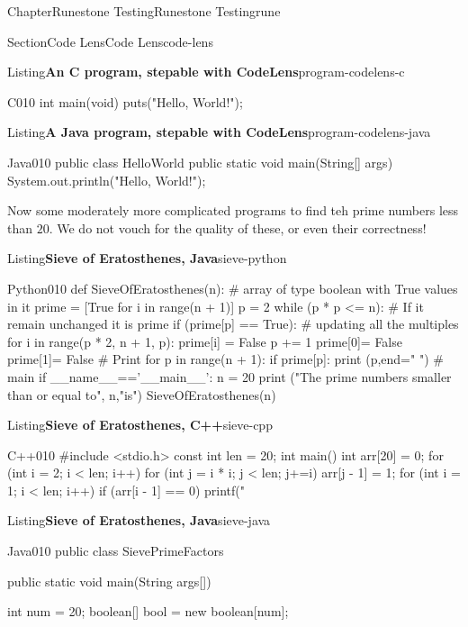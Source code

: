 \documentclass[oneside,10pt,]{book}
\numberwithin{equation}{section}
\begin{document}
\begin{chapterptx}{Chapter}{Runestone Testing}{}{Runestone Testing}{}{}{rune}
\begin{sectionptx}{Section}{Code Lens}{}{Code Lens}{}{}{code-lens}
\begin{listingptx}{Listing}{\textbf{An C program, stepable with CodeLens}}{program-codelens-c}{}
\begin{program}{C}{0}{1}{0}
int main(void)
{
    puts("Hello, World!");
}
\end{program}
\end{listingptx}%
\begin{listingptx}{Listing}{\textbf{A Java program, stepable with CodeLens}}{program-codelens-java}{}%
\begin{program}{Java}{0}{1}{0}
public class HelloWorld {
    public static void main(String[] args) {
        System.out.println("Hello, World!");
    }
}
\end{program}
\end{listingptx}%
Now some moderately more complicated programs to find teh prime numbers less than \(20\).  We do not vouch for the quality of these, or even their correctness!%
\begin{listingptx}{Listing}{\textbf{Sieve of Eratosthenes\protect\footnotemark{}, Java}}{sieve-python}{}%
\begin{program}{Python}{0}{1}{0}
def SieveOfEratosthenes(n):
   # array of type boolean with True values in it
   prime = [True for i in range(n + 1)]
   p = 2
   while (p * p <= n):
      # If it remain unchanged it is prime
      if (prime[p] == True):
         # updating all the multiples
         for i in range(p * 2, n + 1, p):
            prime[i] = False
      p += 1
   prime[0]= False
   prime[1]= False
   # Print
   for p in range(n + 1):
      if prime[p]:
         print (p,end=" ")
# main
if __name__=='__main__':
   n = 20
   print ("The prime numbers smaller than or equal to", n,"is")
   SieveOfEratosthenes(n)
\end{program}
\end{listingptx}%
%
\begin{listingptx}{Listing}{\textbf{Sieve of Eratosthenes\protect\footnotemark{}, C++}}{sieve-cpp}{}%
\begin{program}{C++}{0}{1}{0}
#include <stdio.h>
const int len = 20;
int main() {
   int arr[20] = {0};
   for (int i = 2; i < len; i++) {
      for (int j = i * i; j < len; j+=i) {
         arr[j - 1] = 1;
      }
   }
   for (int i = 1; i < len; i++) {
      if (arr[i - 1] == 0)
        printf(" %
   }
}
\end{program}
\end{listingptx}%
%
\begin{listingptx}{Listing}{\textbf{Sieve of Eratosthenes\protect\footnotemark{}, Java}}{sieve-java}{}%
\begin{program}{Java}{0}{1}{0}
public class SievePrimeFactors  {
   public static void main(String args[]) {
      int num = 20;
      boolean[] bool = new boolean[num];

}}
\end{program}
\end{listingptx}
\end{sectionptx}
\end{chapterptx}
\end{document}
